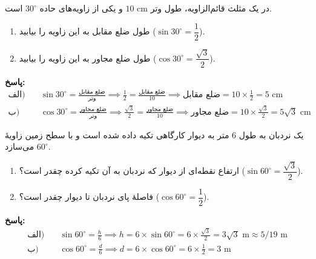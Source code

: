 \documentclass[a4paper,12pt]{article}
\begin{document}
\begin{tcolorbox}[title=\textbf{سؤال ۱۴ (تشریحی)}]
در یک مثلث قائم‌الزاویه، طول وتر $10\text{ cm}$ و یکی از زاویه‌های حاده $30^\circ$ است.
\begin{enumerate}[label=\textbf{\alph*)}]
    \item طول ضلع مقابل به این زاویه را بیابید ($\sin 30^\circ = \dfrac{1}{2}$).
    \item طول ضلع مجاور به این زاویه را بیابید ($\cos 30^\circ = \dfrac{\sqrt{3}}{2}$).
\end{enumerate}
\textbf{پاسخ:}
\begin{align*}
\text{الف)} \quad & \sin 30^\circ = \frac{\text{ضلع مقابل}}{\text{وتر}} \implies \frac{1}{2} = \frac{\text{ضلع مقابل}}{10} \implies \text{ضلع مقابل} = 10 \times \frac{1}{2} = 5 \text{ cm} \\
\text{ب)} \quad & \cos 30^\circ = \frac{\text{ضلع مجاور}}{\text{وتر}} \implies \frac{\sqrt{3}}{2} = \frac{\text{ضلع مجاور}}{10} \implies \text{ضلع مجاور} = 10 \times \frac{\sqrt{3}}{2} = 5\sqrt{3} \text{ cm}
\end{align*}
\end{tcolorbox}

\begin{tcolorbox}[title=\textbf{سؤال ۱۵ (تشریحی)}]
یک نردبان به طول $6$ متر به دیوار کارگاهی تکیه داده شده است و با سطح زمین زاویۀ $60^\circ$ می‌سازد.
\begin{enumerate}[label=\textbf{\alph*)}]
    \item ارتفاع نقطه‌ای از دیوار که نردبان به آن تکیه کرده چقدر است؟ ($\sin 60^\circ = \dfrac{\sqrt{3}}{2}$).
    \item فاصلۀ پای نردبان تا دیوار چقدر است؟ ($\cos 60^\circ = \dfrac{1}{2}$).
\end{enumerate}
\textbf{پاسخ:}
\begin{align*}
\text{الف)} \quad & \sin 60^\circ = \frac{h}{6} \implies h = 6 \times \sin 60^\circ = 6 \times \frac{\sqrt{3}}{2} = 3\sqrt{3} \text{ m} \approx 5/19 \text{ m} \\
\text{ب)} \quad & \cos 60^\circ = \frac{d}{6} \implies d = 6 \times \cos 60^\circ = 6 \times \frac{1}{2} = 3 \text{ m}
\end{align*}
\end{tcolorbox}
\end{document}
